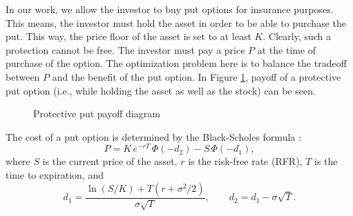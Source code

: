 \documentclass[11pt]{article}
\renewcommand{\P}{\Phi}
\begin{document}
In our work, we allow the investor to buy put options for insurance purposes. This means, the investor must hold the asset in order to be able to purchase the put. This way, the price floor of the asset is set to at least $K$. Clearly, such a protection cannot be free. The investor must pay a price $P$ at the time of purchase of the option. The optimization problem here is to balance the tradeoff between $P$ and the benefit of the put option. In Figure \ref{fig:protective_put}, payoff of a protective put option (i.e., while holding the asset as well as the stock) can be seen.

\begin{figure}[ht]
\centering
{}
\caption{Protective put payoff diagram}
\label{fig:protective_put}
\end{figure}

The cost of a put option is determined by the Black-Scholes formula \citep{black1973}:
\begin{equation}\label{eq:black_scholes}
    P = K \, e^{-rT} \, \Phi(-d_{2}) - S \, \Phi(-d_{1}),
\end{equation}
where $S$ is the current price of the asset, $r$ is the risk-free rate (RFR), $T$ is the time to expiration, and
\begin{equation}\label{eq:black_scholes_ds}
    d_{1} = \frac{\ln(S/K) + T(r + \sigma^2 / 2)}{\sigma \sqrt{T}}, \qquad
    d_{2} = d_{1} - \sigma \sqrt{T}.
\end{equation}
\end{document}
